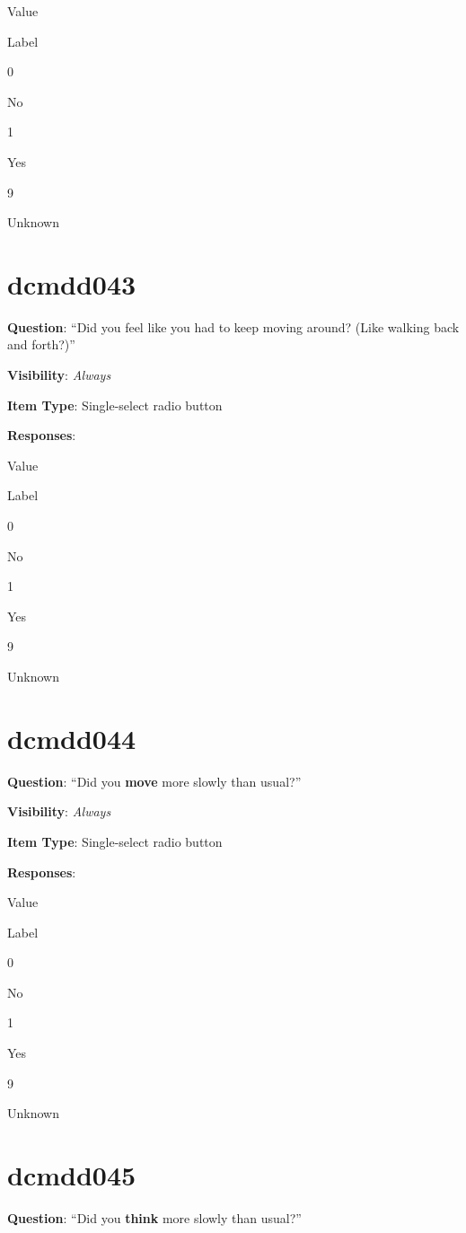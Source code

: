 \documentclass[]{book}
\begin{document}
Value

Label

0

No

1

Yes

9

Unknown

\hypertarget{dcmdd043}{%
\section{dcmdd043}\label{dcmdd043}}

\textbf{Question}: ``Did you feel like you had to keep moving around? (Like walking back and forth?)''

\textbf{Visibility}: \emph{Always}

\textbf{Item Type}: Single-select radio button

\textbf{Responses}:

Value

Label

0

No

1

Yes

9

Unknown

\hypertarget{dcmdd044}{%
\section{dcmdd044}\label{dcmdd044}}

\textbf{Question}: ``Did you \textbf{move} more slowly than usual?''

\textbf{Visibility}: \emph{Always}

\textbf{Item Type}: Single-select radio button

\textbf{Responses}:

Value

Label

0

No

1

Yes

9

Unknown

\hypertarget{dcmdd045}{%
\section{dcmdd045}\label{dcmdd045}}

\textbf{Question}: ``Did you \textbf{think} more slowly than usual?''
\end{document}
